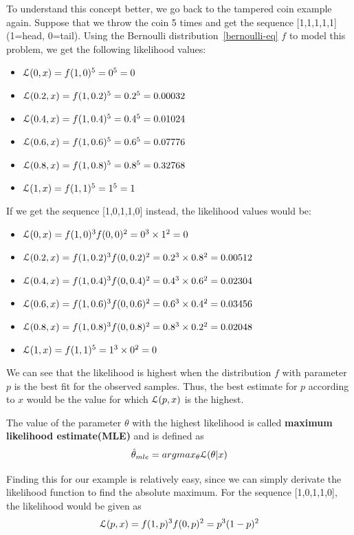 To understand this concept better, we go back to the tampered coin example again. Suppose that we throw the coin 5 times and get the sequence [1,1,1,1,1] (1=head, 0=tail). 
Using the Bernoulli distribution~\ref{bernoulli-eq} $f$ to model this problem, we get the following likelihood values:
\begin{itemize}
\item $\mathcal{L}(0,x) = f(1,0)^5 = 0^5 = 0$
\item $\mathcal{L}(0.2,x) = f(1,0.2)^5 = 0.2^5 = 0.00032$
\item $\mathcal{L}(0.4,x) = f(1,0.4)^5 = 0.4^5 = 0.01024$
\item $\mathcal{L}(0.6,x) = f(1,0.6)^5 = 0.6^5 = 0.07776$
\item $\mathcal{L}(0.8,x) = f(1,0.8)^5 = 0.8^5 = 0.32768$
\item $\mathcal{L}(1,x) = f(1,1)^5 = 1^5 = 1$
\end{itemize}

If we get the sequence [1,0,1,1,0] instead, the likelihood values would be:
\begin{itemize}
\item $\mathcal{L}(0,x) = f(1,0)^3f(0,0)^2 = 0^3\times 1^2 = 0$
\item $\mathcal{L}(0.2,x) = f(1,0.2)^3f(0,0.2)^2 = 0.2^3\times 0.8^2 = 0.00512$
\item $\mathcal{L}(0.4,x) = f(1,0.4)^3f(0,0.4)^2 = 0.4^3\times 0.6^2 = 0.02304$
\item $\mathcal{L}(0.6,x) = f(1,0.6)^3f(0,0.6)^2 = 0.6^3\times 0.4^2 = 0.03456$
\item $\mathcal{L}(0.8,x) = f(1,0.8)^3f(0,0.8)^2 = 0.8^3\times 0.2^2 = 0.02048$
\item $\mathcal{L}(1,x) = f(1,1)^5 = 1^3\times 0^2 = 0$
\end{itemize}

We can see that the likelihood is highest when the distribution $f$ with parameter $p$ is the best fit for the observed samples.
Thus, the best estimate for $p$ according to $x$ would be the value for which $\mathcal{L}(p,x)$ is the highest. 

The value of the parameter $\theta$ with the highest likelihood is called {\bf maximum likelihood estimate(MLE)} and is defined as
\begin{equation*}
\hat{\theta}_{mle}=argmax_{\theta}\mathcal{L}(\theta|x)
\end{equation*}

Finding this for our example is relatively easy, since we can simply derivate the likelihood function to find the absolute maximum. 
For the sequence [1,0,1,1,0], the likelihood would be given as
\begin{equation*}
\mathcal{L}(p,x) = f(1,p)^3f(0,p)^2 = p^3(1-p)^2
\end{equation*}

